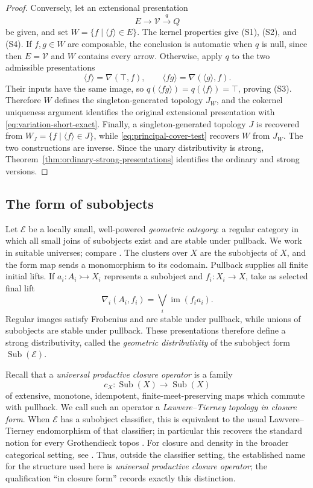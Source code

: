 \documentclass[12pt,oneside,reqno]{amsart}
\theoremstyle{definition}
\theoremstyle{remark}
\newcommand{\Var}{\mathscr V}
\newcommand{\prin}[1]{\langle #1\rangle}
\begin{document}
\begin{proof}
Conversely, let an extensional presentation
\[
 E\longrightarrow\Var\xrightarrow{q}Q
\]
be given, and set \(W=\{f\mid\prin f\in E\}\).  The kernel
properties give (S1), (S2), and (S4).  If \(f,g\in W\) are composable,
the conclusion is automatic when \(q\) is null, since then \(E=\Var\)
and \(W\) contains every arrow.  Otherwise, apply \(q\) to the two
admissible presentations
\[
 \prin f=\nabla(\top,f),
 \qquad
 \prin{fg}=\nabla(\prin g,f).
\]
Their inputs have the same image, so
\(q(\prin{fg})=q(\prin f)=\top\), proving (S3).  Therefore \(W\)
defines the singleton-generated topology \(J_W\), and the cokernel
uniqueness argument identifies the original extensional presentation with
\eqref{eq:variation-short-exact}.  Finally, a singleton-generated
topology \(J\) is recovered from
\(W_J=\{f\mid\prin f\in J\}\), while
\eqref{eq:principal-cover-test} recovers \(W\) from \(J_W\).  The two
constructions are inverse.  Since the unary distributivity is strong,
Theorem~\ref{thm:ordinary-strong-presentations} identifies the ordinary
and strong versions.
\end{proof}

\subsection{The form of subobjects}
\label{sec:subobject-form}

Let \(\mathscr E\) be a locally small, well-powered
\emph{geometric category}: a regular category in which all small joins
of subobjects exist and are stable under pullback.  We work in suitable
universes; compare \cite[A1.4]{JohnstoneElephant}.  The clusters over
\(X\) are the subobjects of \(X\), and
the form map sends a monomorphism to its codomain.  Pullback supplies
all finite initial lifts.  If \(a_i:A_i\rightarrowtail X_i\) represents
a subobject and \(f_i:X_i\to X\), take as selected final lift
\begin{equation}\label{eq:subobject-final-lift}
 \nabla_i(A_i,f_i)=\bigvee_i\operatorname{im}(f_i a_i).
\end{equation}
Regular images satisfy Frobenius and are stable under pullback, while
unions of subobjects are stable under pullback.  These presentations
therefore define a strong distributivity, called the
\emph{geometric distributivity} of the subobject form
\(\operatorname{Sub}(\mathscr E)\).

Recall that a \emph{universal productive closure operator} is a family
\[
 c_X:\operatorname{Sub}(X)\longrightarrow\operatorname{Sub}(X)
\]
of extensive, monotone, idempotent, finite-meet-preserving maps which
commute with pullback.  We call such an operator a
\emph{Lawvere--Tierney topology in closure form}.  When \(\mathscr E\)
has a subobject classifier, this is equivalent to the usual
Lawvere--Tierney endomorphism of that classifier; in particular this
recovers the standard notion for every Grothendieck topos
\cite{MacLaneMoerdijk,JohnstoneElephant}.  For closure and density in
the broader categorical setting, see
\cite{DikranjanTholen,DuckertsAntoineGranJanelidze}.
Thus, outside the classifier setting, the established name for the
structure used here is \emph{universal productive closure operator};
the qualification ``in closure form'' records exactly this distinction.
\end{document}
